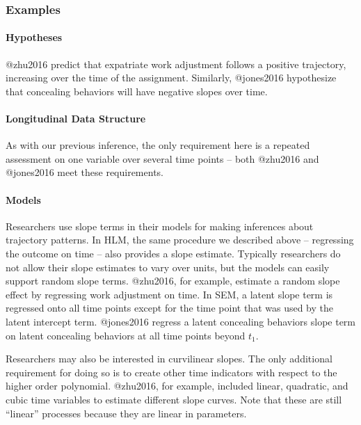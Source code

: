 \documentclass[]{article}
\let\oldparagraph\paragraph
\renewcommand{\paragraph}[1]{\oldparagraph{#1}\mbox{}}
\begin{document}
\hypertarget{examples-2}{%
\subsubsection{Examples}\label{examples-2}}

\hypertarget{hypotheses-2}{%
\paragraph{Hypotheses}\label{hypotheses-2}}

@zhu2016 predict that expatriate work adjustment follows a positive
trajectory, increasing over the time of the assignment. Similarly,
@jones2016 hypothesize that concealing behaviors will have negative
slopes over time.

\hypertarget{longitudinal-data-structure-2}{%
\paragraph{Longitudinal Data
Structure}\label{longitudinal-data-structure-2}}

As with our previous inference, the only requirement here is a repeated
assessment on one variable over several time points -- both @zhu2016 and
@jones2016 meet these requirements.

\hypertarget{models-2}{%
\paragraph{Models}\label{models-2}}

Researchers use slope terms in their models for making inferences about
trajectory patterns. In HLM, the same procedure we described above --
regressing the outcome on time -- also provides a slope estimate.
Typically researchers do not allow their slope estimates to vary over
units, but the models can easily support random slope terms. @zhu2016,
for example, estimate a random slope effect by regressing work
adjustment on time. In SEM, a latent slope term is regressed onto all
time points except for the time point that was used by the latent
intercept term. @jones2016 regress a latent concealing behaviors slope
term on latent concealing behaviors at all time points beyond \(t_1\).

Researchers may also be interested in curvilinear slopes. The only
additional requirement for doing so is to create other time indicators
with respect to the higher order polynomial. @zhu2016, for example,
included linear, quadratic, and cubic time variables to estimate
different slope curves. Note that these are still ``linear'' processes
because they are linear in parameters.
\end{document}
